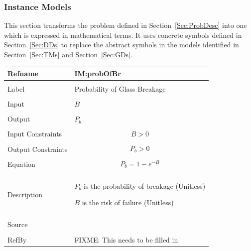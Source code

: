 \documentclass[12pt]{article}
\begin{document}
\subsubsection{Instance Models}
\label{Sec:IMs}
This section transforms the problem defined in Section~\ref{Sec:ProbDesc} into one which is expressed in mathematical terms. It uses concrete symbols defined in Section~\ref{Sec:DDs} to replace the abstract symbols in the models identified in Section~\ref{Sec:TMs} and Section~\ref{Sec:GDs}.
~\newline
\noindent \begin{minipage}{\textwidth}
\begin{tabular}{p{} p{}}
\toprule \textbf{Refname} & \textbf{IM:probOfBr}
\label{IM:probOfBr}
\\ \midrule \\
Label & Probability of Glass Breakage
\\ \midrule \\
Input & $B$
\\ \midrule \\
Output & ${P_{b}}$
\\ \midrule \\
Input Constraints & \begin{dmath}
                    B>0
                    \end{dmath}
\\ \midrule \\
Output Constraints & \begin{dmath}
                     {P_{b}}>0
                     \end{dmath}
\\ \midrule \\
Equation & \begin{dmath}
           {P_{b}}=1-e^{-B}
           \end{dmath}
\\ \midrule \\
Description & \begin{symbDescription}
              \item{${P_{b}}$ is the probability of breakage (Unitless)}
              \item{$B$ is the risk of failure (Unitless)}
              \end{symbDescription}
\\ \midrule \\
Source & 
\\ \midrule \\
RefBy & FIXME: This needs to be filled in
\\ \bottomrule \end{tabular}
\end{minipage}\\
\end{document}
